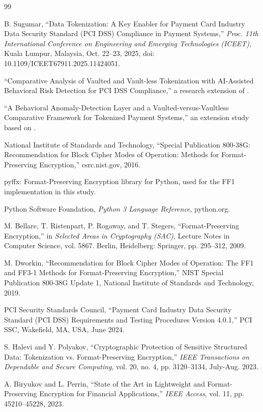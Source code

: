 \documentclass[conference]{IEEEtran}
\begin{document}
\begin{thebibliography}{99}

 B. Sugumar, ``Data Tokenization: A Key Enabler for Payment Card Industry Data Security Standard (PCI DSS) Compliance in Payment Systems,'' \textit{Proc. 11th International Conference on Engineering and Emerging Technologies (ICEET)}, Kuala Lumpur, Malaysia, Oct. 22--23, 2025, doi: 10.1109/ICEET67911.2025.11424051.

 ``Comparative Analysis of Vaulted and Vault-less Tokenization with AI-Assisted Behavioral Risk Detection for PCI DSS Compliance,'' a research extension of \cite{b1}.

 ``A Behavioral Anomaly-Detection Layer and a Vaulted-versus-Vaultless Comparative Framework for Tokenized Payment Systems,'' an extension study based on \cite{b1}.

 National Institute of Standards and Technology, ``Special Publication 800-38G: Recommendation for Block Cipher Modes of Operation: Methods for Format-Preserving Encryption,'' csrc.nist.gov, 2016.

 pyffx: Format-Preserving Encryption library for Python, used for the FF1 implementation in this study.

 Python Software Foundation, \textit{Python 3 Language Reference}, python.org.

 M. Bellare, T. Ristenpart, P. Rogaway, and T. Stegers, ``Format-Preserving Encryption,'' in \textit{Selected Areas in Cryptography (SAC)}, Lecture Notes in Computer Science, vol. 5867. Berlin, Heidelberg: Springer, pp. 295--312, 2009.

 M. Dworkin, ``Recommendation for Block Cipher Modes of Operation: The FF1 and FF3-1 Methods for Format-Preserving Encryption,'' NIST Special Publication 800-38G Update 1, National Institute of Standards and Technology, 2019.

 PCI Security Standards Council, ``Payment Card Industry Data Security Standard (PCI DSS) Requirements and Testing Procedures Version 4.0.1,'' PCI SSC, Wakefield, MA, USA, June 2024.

 S. Halevi and Y. Polyakov, ``Cryptographic Protection of Sensitive Structured Data: Tokenization vs. Format-Preserving Encryption,'' \textit{IEEE Transactions on Dependable and Secure Computing}, vol. 20, no. 4, pp. 3120--3134, July-Aug. 2023.

 A. Biryukov and L. Perrin, ``State of the Art in Lightweight and Format-Preserving Encryption for Financial Applications,'' \textit{IEEE Access}, vol. 11, pp. 45210--45228, 2023.


\end{thebibliography}
\end{document}
